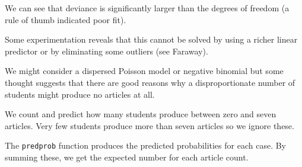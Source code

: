 \documentclass[
  ignorenonframetext,
]{beamer}
\newenvironment{Shaded}{\begin{snugshade}}{\end{snugshade}}
\newcommand{\DecValTok}[1]{\textcolor[rgb]{0.00,0.00,0.81}{#1}}
\newcommand{\FunctionTok}[1]{\textcolor[rgb]{0.00,0.00,0.00}{#1}}
\newcommand{\NormalTok}[1]{#1}
\newcommand{\OtherTok}[1]{\textcolor[rgb]{0.56,0.35,0.01}{#1}}
\newcommand{\SpecialCharTok}[1]{\textcolor[rgb]{0.00,0.00,0.00}{#1}}
\begin{document}
\begin{frame}{}
\protect\hypertarget{section-37}{}
We can see that deviance is significantly larger than the degrees of
freedom (a rule of thumb indicated poor fit).

\vspace{12pt}

Some experimentation reveals that this cannot be solved by using a
richer linear predictor or by eliminating some outliers (see Faraway).

\vspace{12pt}

We might consider a dispersed Poisson model or negative binomial but
some thought suggests that there are good reasons why a disproportionate
number of students might produce no articles at all.
\end{frame}

\begin{frame}[fragile]{}
\protect\hypertarget{section-38}{}
We count and predict how many students produce between zero and seven
articles. Very few students produce more than seven articles so we
ignore these.

\vspace{12pt}

The \texttt{predprob} function produces the predicted probabilities for
each case. By summing these, we get the expected number for each article
count.

\vspace{12pt}
\tiny

\begin{Shaded}
\end{Shaded}
\end{frame}
\end{document}
